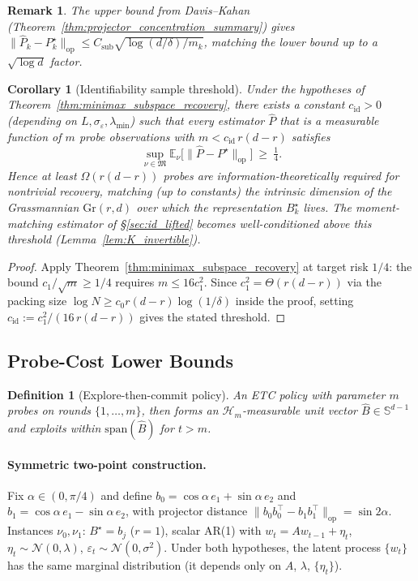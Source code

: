 \documentclass[11pt]{article}
\newcommand{\E}{\mathbb{E}}
\newcommand{\op}{\mathrm{op}}
\newcommand{\cH}{\mathcal{H}}
\newcommand{\Span}{\mathrm{span}}
\newtheorem{definition}{Definition}
\newtheorem{corollary}{Corollary}
\newtheorem{remark}{Remark}
\begin{document}
\begin{remark}
The upper bound from Davis--Kahan
(Theorem~\ref{thm:projector_concentration_summary}) gives
$\|\widehat{P}_k-P_k^\star\|_{\op}
\le C_{\mathrm{sub}}\sqrt{\log(d/\delta)/m_k}$,
matching the lower bound up to a $\sqrt{\log d}$ factor.
\end{remark}

\begin{corollary}[Identifiability sample threshold]
\label{cor:identifiability_threshold}
Under the hypotheses of Theorem~\ref{thm:minimax_subspace_recovery}, there
exists a constant $c_{\mathrm{id}}>0$ (depending on $L,\sigma_\varepsilon,
\lambda_{\min}$) such that every estimator $\widehat P$ that is a measurable
function of $m$ probe observations with
$m<c_{\mathrm{id}}\,r(d-r)$ satisfies
\[
  \sup_{\nu\in\mathfrak{M}}\E_\nu\bigl[\|\widehat P-P^\star\|_{\op}\bigr]
  \ \ge\ \tfrac{1}{4}.
\]
Hence at least $\Omega(r(d-r))$ probes are information-theoretically
required for nontrivial recovery, matching (up to constants) the intrinsic
dimension of the Grassmannian $\mathrm{Gr}(r,d)$ over which the
representation $B_k^\star$ lives.  The moment-matching estimator of
\S\ref{sec:id_lifted} becomes well-conditioned above this threshold
(Lemma~\ref{lem:K_invertible}).
\end{corollary}

\begin{proof}
Apply Theorem~\ref{thm:minimax_subspace_recovery} at target risk $1/4$:
the bound $c_1/\sqrt{m}\ge 1/4$ requires $m\le 16c_1^2$.  Since
$c_1^2=\Theta(r(d-r))$ via the packing size $\log N\ge c_0 r(d-r)\log(1/\delta)$
inside the proof, setting $c_{\mathrm{id}}:=c_1^2/(16\,r(d-r))$
gives the stated threshold.
\end{proof}

\subsection{Probe-Cost Lower Bounds}
\label{sec:probe_lb}

\begin{definition}[Explore-then-commit policy]
\label{def:etc_policy}
An ETC policy with parameter $m$ probes on rounds $\{1,\ldots,m\}$, then forms an
$\cH_m$-measurable unit vector $\hat{B}\in\mathbb{S}^{d-1}$ and exploits within
$\Span(\hat{B})$ for $t>m$.
\end{definition}

\paragraph{Symmetric two-point construction.}
Fix $\alpha\in(0,\pi/4)$ and define
$b_0=\cos\alpha\,e_1+\sin\alpha\,e_2$ and
$b_1=\cos\alpha\,e_1-\sin\alpha\,e_2$,
with projector distance $\|b_0b_0^\top-b_1b_1^\top\|_{\op}=\sin 2\alpha$.
Instances $\nu_0,\nu_1$: $B^\star=b_j$ ($r=1$), scalar AR(1) with $w_t=Aw_{t-1}+\eta_t$,
$\eta_t\sim\mathcal{N}(0,\lambda)$, $\varepsilon_t\sim\mathcal{N}(0,\sigma^2)$.
Under both hypotheses, the latent process $\{w_t\}$ has the same marginal distribution
(it depends only on $A$, $\lambda$, $\{\eta_t\}$).
\end{document}
